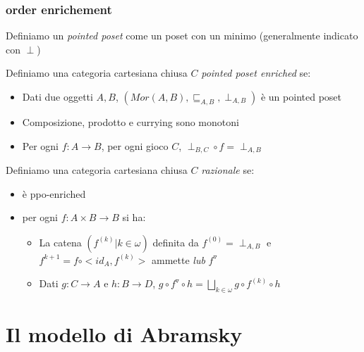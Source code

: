\documentclass{beamer}
\begin{document}
\begin{frame}
	
	\frametitle{order enrichement}
	
	Definiamo un \emph{pointed poset} come un poset con un minimo (generalmente indicato con $\perp$)
	
	Definiamo una categoria cartesiana chiusa $C$ \emph{pointed poset enriched} se:
	\begin{itemize}
		\item Dati due oggetti $A,B$, $(Mor(A,B),\sqsubseteq _{A,B},\perp _{A,B})$ è un pointed poset
		\item Composizione, prodotto e currying sono monotoni
		\item Per ogni $f: A\rightarrow B$, per ogni gioco $C$, $\perp_{B,C} \circ f = \perp _{A,B}$
	\end{itemize}
	
	Definiamo una categoria cartesiana chiusa $C$ \emph{razionale} se:
	\begin{itemize}
		\item è ppo-enriched
		\item per ogni $f: A\times B \rightarrow B$ si ha:
		\begin{itemize}
			\item La catena $(f^{(k)} | k\in \omega)$ definita da $f^{(0)}=\perp _{A,B}$ e $f^{k+1} = f \circ <id_A , f^{(k)}>$ ammette \emph{lub} $f^{\triangledown}$
			\item Dati $g:C\rightarrow A$ e $h:B\rightarrow D$, $g\circ f^\triangledown \circ h = \bigsqcup_{k\in \omega} g \circ f^{(k)} \circ h$
		\end{itemize}

	\end{itemize}
	
\end{frame}




\section{Il modello di Abramsky}
\end{document}
